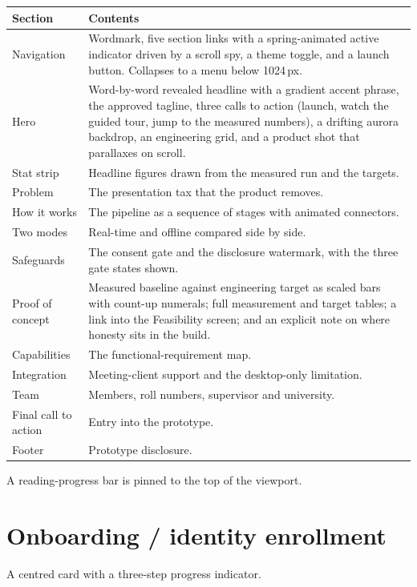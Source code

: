 \documentclass[11pt,a4paper]{report}
\begin{document}
\begin{longtable}{L{3.6cm} L{11.2cm}}
\toprule
\textbf{Section} & \textbf{Contents} \\
\midrule
\endhead
Navigation & Wordmark, five section links with a spring-animated active
  indicator driven by a scroll spy, a theme toggle, and a launch button.
  Collapses to a menu below 1024\,px. \\
Hero & Word-by-word revealed headline with a gradient accent phrase, the
  approved tagline, three calls to action (launch, watch the guided tour, jump
  to the measured numbers), a drifting aurora backdrop, an engineering grid,
  and a product shot that parallaxes on scroll. \\
Stat strip & Headline figures drawn from the measured run and the targets. \\
Problem & The presentation tax that the product removes. \\
How it works & The pipeline as a sequence of stages with animated connectors. \\
Two modes & Real-time and offline compared side by side. \\
Safeguards & The consent gate and the disclosure watermark, with the three
  gate states shown. \\
Proof of concept & Measured baseline against engineering target as scaled
  bars with count-up numerals; full measurement and target tables; a link into
  the Feasibility screen; and an explicit note on where honesty sits in the
  build. \\
Capabilities & The functional-requirement map. \\
Integration & Meeting-client support and the desktop-only limitation. \\
Team & Members, roll numbers, supervisor and university. \\
Final call to action & Entry into the prototype. \\
Footer & Prototype disclosure. \\
\bottomrule
\end{longtable}

A reading-progress bar is pinned to the top of the viewport.

\section{Onboarding / identity enrollment}

A centred card with a three-step progress indicator.
\end{document}
